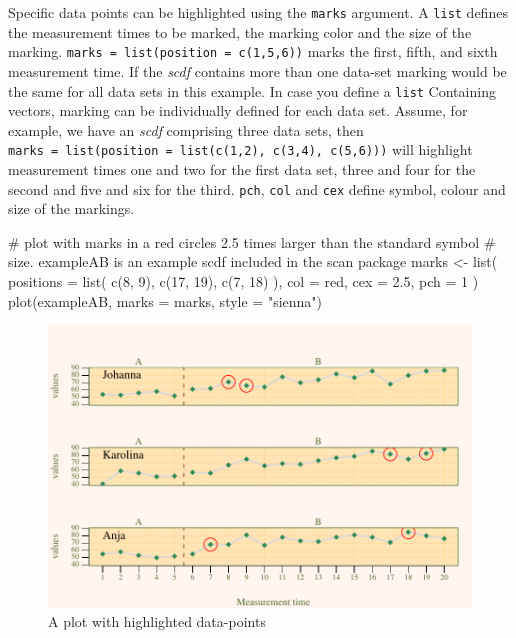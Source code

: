\documentclass[
  letterpaper,
  DIV=11,
  numbers=noendperiod]{scrreprt}
\newenvironment{Shaded}{\begin{snugshade}}{\end{snugshade}}
\newcommand{\AttributeTok}[1]{\textcolor[rgb]{0.40,0.45,0.13}{#1}}
\newcommand{\CommentTok}[1]{\textcolor[rgb]{0.37,0.37,0.37}{#1}}
\newcommand{\DecValTok}[1]{\textcolor[rgb]{0.68,0.00,0.00}{#1}}
\newcommand{\FloatTok}[1]{\textcolor[rgb]{0.68,0.00,0.00}{#1}}
\newcommand{\FunctionTok}[1]{\textcolor[rgb]{0.28,0.35,0.67}{#1}}
\newcommand{\NormalTok}[1]{\textcolor[rgb]{0.00,0.23,0.31}{#1}}
\newcommand{\OtherTok}[1]{\textcolor[rgb]{0.00,0.23,0.31}{#1}}
\newcommand{\StringTok}[1]{\textcolor[rgb]{0.13,0.47,0.30}{#1}}
\begin{document}
Specific data points can be highlighted using the \texttt{marks}
argument. A \texttt{list} defines the measurement times to be marked,
the marking color and the size of the marking.
\texttt{marks\ =\ list(position\ =\ c(1,5,6))} marks the first, fifth,
and sixth measurement time. If the \emph{scdf} contains more than one
data-set marking would be the same for all data sets in this example. In
case you define a \texttt{list} Containing vectors, marking can be
individually defined for each data set. Assume, for example, we have an
\emph{scdf} comprising three data sets, then
\texttt{marks\ =\ list(position\ =\ list(c(1,2),\ c(3,4),\ c(5,6)))}
will highlight measurement times one and two for the first data set,
three and four for the second and five and six for the third.
\texttt{pch}, \texttt{col} and \texttt{cex} define symbol, colour and
size of the markings.

\begin{Shaded}
\begin{Highlighting}[]
\CommentTok{\# plot with marks in a red circles 2.5 times larger than the standard symbol }
\CommentTok{\# size. exampleAB is an example scdf included in the scan package}
\NormalTok{marks }\OtherTok{\textless{}{-}} \FunctionTok{list}\NormalTok{(}
  \AttributeTok{positions =} \FunctionTok{list}\NormalTok{( }\FunctionTok{c}\NormalTok{(}\DecValTok{8}\NormalTok{, }\DecValTok{9}\NormalTok{), }\FunctionTok{c}\NormalTok{(}\DecValTok{17}\NormalTok{, }\DecValTok{19}\NormalTok{), }\FunctionTok{c}\NormalTok{(}\DecValTok{7}\NormalTok{, }\DecValTok{18}\NormalTok{) ), }
  \AttributeTok{col =} \StringTok{\textquotesingle{}red\textquotesingle{}}\NormalTok{, }\AttributeTok{cex =} \FloatTok{2.5}\NormalTok{, }\AttributeTok{pch =} \DecValTok{1}
\NormalTok{)}
\FunctionTok{plot}\NormalTok{(exampleAB, }\AttributeTok{marks =}\NormalTok{ marks, }\AttributeTok{style =} \StringTok{"sienna"}\NormalTok{)}
\end{Highlighting}
\end{Shaded}

\begin{figure}[H]

{\centering \includegraphics{./app_supseded_functions_files/figure-pdf/marks-example-1.pdf}

}

\caption{A plot with highlighted data-points}

\end{figure}
\end{document}
